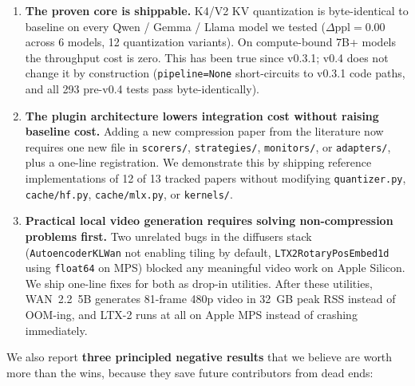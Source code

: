 \documentclass[11pt,a4paper]{article}
\begin{document}
\begin{enumerate}[label=(\arabic*)]
  \item \textbf{The proven core is shippable.} K4/V2 KV quantization is byte-identical to baseline on every Qwen / Gemma / Llama model we tested ($\Delta\text{ppl} = 0.00$ across 6 models, 12 quantization variants). On compute-bound 7B+ models the throughput cost is zero. This has been true since v0.3.1; v0.4 does not change it by construction (\texttt{pipeline=None} short-circuits to v0.3.1 code paths, and all 293 pre-v0.4 tests pass byte-identically).
  \item \textbf{The plugin architecture lowers integration cost without raising baseline cost.} Adding a new compression paper from the literature now requires one new file in \texttt{scorers/}, \texttt{strategies/}, \texttt{monitors/}, or \texttt{adapters/}, plus a one-line registration. We demonstrate this by shipping reference implementations of 12 of 13 tracked papers without modifying \texttt{quantizer.py}, \texttt{cache/hf.py}, \texttt{cache/mlx.py}, or \texttt{kernels/}.
  \item \textbf{Practical local video generation requires solving non-compression problems first.} Two unrelated bugs in the diffusers stack (\texttt{AutoencoderKLWan} not enabling tiling by default, \texttt{LTX2RotaryPosEmbed1d} using \texttt{float64} on MPS) blocked any meaningful video work on Apple Silicon. We ship one-line fixes for both as drop-in utilities. After these utilities, WAN~2.2~5B generates 81-frame 480p video in 32~GB peak RSS instead of OOM-ing, and LTX-2 runs at all on Apple MPS instead of crashing immediately.
\end{enumerate}

We also report \textbf{three principled negative results} that we believe are worth more than the wins, because they save future contributors from dead ends:
\end{document}
